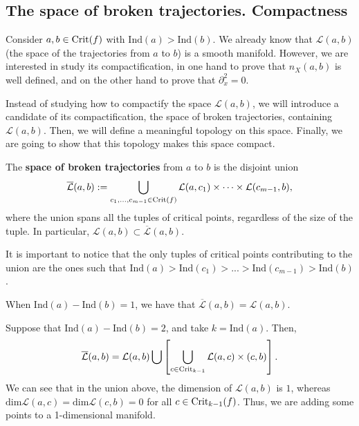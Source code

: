 \subsection{The space of broken trajectories. Compactness}

Consider $a, b \in \mathrm{Crit}(f)$ with $\text{Ind}(a) > \text{Ind}(b)$. We already know that $\mathcal{L}(a,b)$ (the space of the trajectories from $a$ to $b$) is a smooth manifold. However, we are interested in study its compactification, in one hand to prove that $n_X(a,b)$ is well defined, and on the other hand to prove that $\partial_x^2 = 0$.

Instead of studying how to compactify the space $\mathcal{L}(a,b)$, we will introduce a candidate of its compactification, the space of broken trajectories, containing $\mathcal{L}(a,b)$. Then, we will define a meaningful topology on this space. Finally, we are going to show that this topology makes this space compact.

\begin{deff}
The {\bf space of broken trajectories} from $a$ to $b$ is the disjoint union
\[\overline{\mathcal{L}}(a,b) := \bigcup_{c_1,...,c_{m-1} \in \mathrm{Crit}(f)} \mathcal{L}(a,c_1) \times \cdots \times \mathcal{L}(c_{m-1},b) ,\]
where the union spans all the tuples of critical points, regardless of the size of the tuple. In particular, $\mathcal{L}(a,b) \subset \overline{\mathcal{L}}(a,b)$.

It is important to notice that the only tuples of critical points contributing to the union are the ones such that $\text{Ind}(a) > \text{Ind}(c_1) > ... > \text{Ind}(c_{m-1}) > \text{Ind}(b)$.
\end{deff}

\begin{rmrk}
When $\text{Ind}(a) - \text{Ind}(b) = 1$, we have that $\overline{\mathcal{L}}(a,b) = \mathcal{L}(a,b)$.
\end{rmrk}

\begin{rmrk}
Suppose that $\text{Ind}(a) - \text{Ind}(b) = 2$, and take $k = \text{Ind}(a)$. Then,
\[\overline{\mathcal{L}}(a,b) = \mathcal{L}(a,b) \bigcup \left[ \bigcup_{c \in \mathrm{Crit}_{k-1}} \mathcal{L}(a,c) \times \mathcal(c,b) \right] .\]
We can see that in the union above, the dimension of $\mathcal{L}(a,b)$ is $1$, whereas $\text{dim} \mathcal{L}(a,c) = \text{dim} \mathcal{L}(c,b) = 0$ for all $c \in \mathrm{Crit}_{k-1}(f)$. Thus, we are adding some points to a 1-dimensional manifold.
\end{rmrk}

